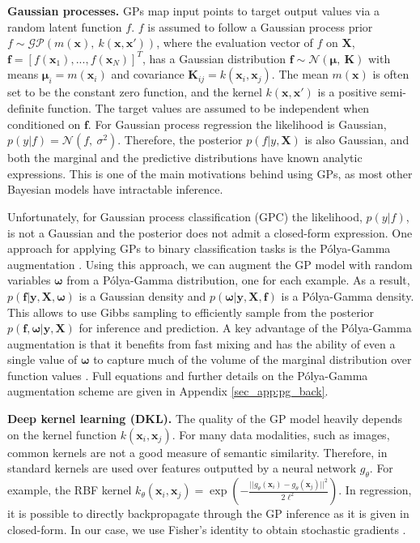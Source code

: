 \documentclass{article}
\newcommand{\bld}[1]{\boldsymbol{#1}}
\def\rvf{{\mathbf{f}}}
\def\rvx{{\mathbf{x}}}
\def\rvy{{\mathbf{y}}}
\def\rmX{{\mathbf{X}}}
\newcommand{\bK}{\boldsymbol{K}}
\newcommand{\pg}{P\'olya-Gamma }
\newcommand{\rvomega}{\bld{\mathbf{\omega}}}
\begin{document}
\textbf{Gaussian processes.}\label{sec:GPC}
GPs map input points to target output values  via a random latent function $f$. $f$ is assumed to follow a Gaussian process prior  $f\sim\mathcal{GP}(m(\rvx),~k(\rvx,\rvx'))$, where the evaluation vector of $f$ on $\rmX$,  $\rvf=[f(\rvx_1),...,f(\rvx_N)]^T$, has a Gaussian distribution $\rvf\sim\mathcal{N}(\boldsymbol{\mu},~\bK)$ with means $\boldsymbol{\mu}_i=m(\rvx_i)$ and covariance $\bK_{ij}=k(\rvx_i,\rvx_j)$. The mean $m(\rvx)$ is often set to be the constant zero function, and the kernel $k(\rvx,\rvx')$ is a positive semi-definite function. The target values are assumed to be independent when conditioned on $\rvf$. For Gaussian process regression the likelihood is Gaussian, $p(y|f)=\mathcal{N}(f,~\sigma^2)$. Therefore, the posterior $p(f|y,\rmX)$ is also Gaussian, and both the marginal and the predictive distributions have known analytic expressions. This is one of the main motivations behind using GPs, as most other Bayesian models have intractable inference.

Unfortunately, for Gaussian process classification (GPC) the likelihood, $p(y|f)$, is not a Gaussian and the posterior does not admit a closed-form expression. One approach for applying GPs to binary classification tasks is the \pg augmentation \cite{polya_gamma}. Using this approach, we can augment the GP model with random variables $\rvomega$ from a \pg distribution, one for each example. As a result, $p(\rvf|\rvy,\rmX,\rvomega)$ is a Gaussian density and $p(\rvomega|\rvy,\rmX,\rvf)$ is a \pg density. This allows to use Gibbs sampling to efficiently sample from the posterior $p(\rvf,\rvomega|\rvy,\rmX)$ for inference and prediction. A key advantage of the \pg augmentation is that it benefits from fast mixing and has the ability of even a single value of $\rvomega$ to capture much of the volume of the marginal distribution over function values \cite{linderman2015dependent}. Full equations and further details on the \pg augmentation scheme are given in Appendix \ref{sec_app:pg_back}.

\textbf{Deep kernel learning (DKL).} 
The quality of the GP model heavily depends on the kernel function $k(\rvx_i,\rvx_j)$.
For many data modalities, such as images, common kernels are not a good measure of semantic similarity. Therefore, in \cite{calandra2016manifold, gordon16_DKL} standard kernels are used over features outputted by a neural network $g_\theta$. For example, the RBF kernel $k_\theta(\rvx_i,\rvx_j)=\exp\left(-\frac{||g_\theta(\rvx_i)-g_\theta(\rvx_j)||^2}{2\ell^2}\right)$. 
In regression, it is possible to directly backpropagate through the GP inference as it is given in closed-form. In our case, we use Fisher's identity \cite{douc2014nonlinear} to obtain stochastic gradients \cite{snell2020bayesian}.
\end{document}
